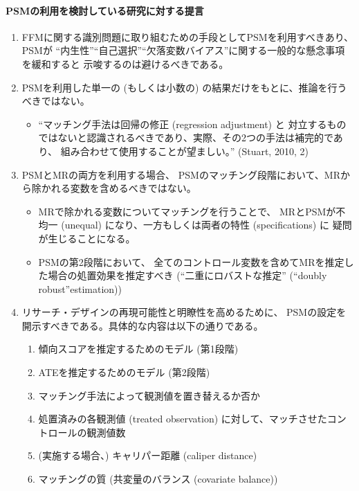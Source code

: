 \paragraph{PSMの利用を検討している研究に対する提言}
\begin{enumerate}
 \item FFMに関する識別問題に取り組むための手段としてPSMを利用すべきあり、PSMが
       ``内生性''``自己選択''``欠落変数バイアス''に関する一般的な懸念事項を緩和すると
       示唆するのは避けるべきである。
 \item PSMを利用した単一の (もしくは小数の) の結果だけをもとに、推論を行うべきではない。
       \begin{itemize}
        \item ``マッチング手法は回帰の修正 (regression adjustment) と
              対立するものではないと認識されるべきであり、実際、その2つの手法は補完的であり、
              組み合わせて使用することが望ましい。'' (Stuart, 2010, 2)
       \end{itemize}
 \item PSMとMRの両方を利用する場合、
       PSMのマッチング段階において、MRから除かれる変数を含めるべきではない。
       \begin{itemize}
        \item MRで除かれる変数についてマッチングを行うことで、
              MRとPSMが不均一 (unequal) になり、一方もしくは両者の特性 (specifications) に
              疑問が生じることになる。
        \item PSMの第2段階において、
              全てのコントロール変数を含めてMRを推定した場合の処置効果を推定すべき (``二重にロバストな推定'' (``doubly robust''estimation))
       \end{itemize}
 \item リサーチ・デザインの再現可能性と明瞭性を高めるために、
       PSMの設定を開示すべきである。具体的な内容は以下の通りである。
       \begin{enumerate}
        \item 傾向スコアを推定するためのモデル (第1段階)
        \item ATEを推定するためのモデル (第2段階)
        \item マッチング手法によって観測値を置き替えるか否か
        \item 処置済みの各観測値 (treated observation) に対して、マッチさせたコントロールの観測値数
        \item (実施する場合、) キャリパー距離 (caliper distance)
        \item マッチングの質 (共変量のバランス (covariate balance))
       \end{enumerate}
\end{enumerate}

